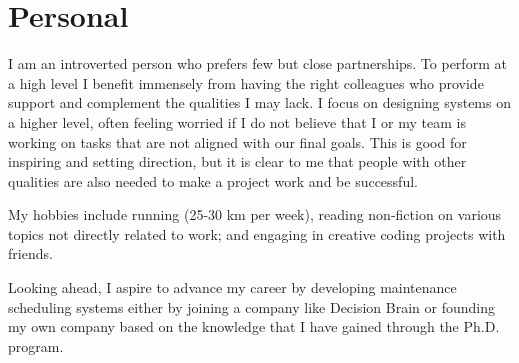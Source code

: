 \section{Personal}

I am an introverted person who prefers few but close partnerships. To perform at a high level
I benefit immensely from having the right colleagues who provide support and complement the 
qualities I may lack. I focus on designing systems on a higher level, often feeling worried if I 
do not believe that I or my team is working on tasks that are not aligned with our final goals. 
This is good for inspiring and setting direction, but it is clear to me that people with other 
qualities are also needed to make a project work and be successful.

My hobbies include running (25-30 km per week), reading non-fiction on various topics not directly related to work; 
and engaging in creative coding projects with friends.

Looking ahead, I aspire to advance my career by developing maintenance scheduling systems
either by joining a company like Decision Brain or founding my own company based on the
knowledge that I have gained through the Ph.D. program.

